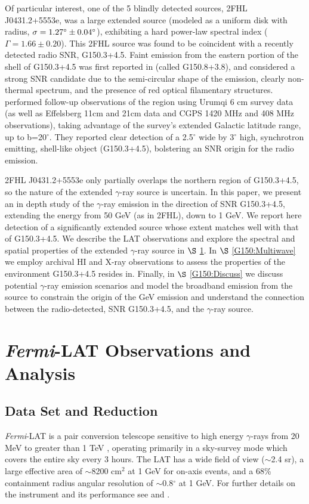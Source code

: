 \documentclass[iop]{emulateapj}
\newcommand{\gam}{$\gamma$-ray}
\newcommand{\FermiLat}{\emph{Fermi}-LAT }     %
\newcommand{\Gone}{G150.3+4.5}
\begin{document}
Of particular interest, one of the 5 blindly detected sources, 2FHL J0431.2+5553e, was a large extended source  (modeled as a uniform disk with radius, ${\rm \sigma = 1.27^\circ \pm 0.04^\circ}$), exhibiting a hard power-law spectral index ($\Gamma = 1.66 \pm 0.20$). This 2FHL source was found to be coincident with a recently detected radio SNR, \Gone{}. Faint emission from the eastern portion of the shell of \Gone{} was first reported in \cite{Gerbrandt14} (called G150.8+3.8), and considered a strong SNR candidate due to the semi-circular shape of the emission, clearly non-thermal spectrum, and the presence of red optical filamentary structures. \cite{Gao14} performed follow-up observations of the region using Urumqi 6 cm survey data (as well as Effelsberg 11cm and 21cm data and CGPS 1420 MHz and 408 MHz observations), taking advantage of the survey's extended Galactic latitude range, up to b=20$^\circ$. They reported clear detection of a 2.5$^\circ$ wide by 3$^\circ$ high, synchrotron emitting, shell-like object (\Gone{}),  bolstering an SNR origin for the radio emission.

2FHL J0431.2+5553e only partially overlaps the northern region of \Gone{}, so the nature of the extended \gam{} source is uncertain. In this paper, we present an in depth study of the \gam{} emission in the direction of SNR \Gone{}, extending the energy from 50 GeV (as in 2FHL), down to 1 GeV.  We report here  detection of  a significantly extended source whose extent matches well with that of \Gone{}. We describe the LAT observations and explore the spectral and spatial properties of the extended \gam{} source in $\S$ \ref{G150:LATobs}. In $\S$ \ref{G150:Multiwave} we employ archival HI and X-ray observations to assess the properties of the environment \Gone{} resides in. Finally, in $\S$ \ref{G150:Discuss} we discuss potential \gam{} emission scenarios and model the broadband emission from the source to constrain the origin of the GeV emission and understand the connection between the radio-detected, SNR \Gone{}, and the \gam{} source.

%
%

\newpage
\section{\FermiLat{} Observations and  Analysis }\label{G150:LATobs}
\subsection{Data Set and Reduction}\label{G150:LATdata}
\FermiLat{} is a pair conversion telescope sensitive to high energy \gam{}s  from 20 MeV to greater than 1 TeV \citep{2FHL}, operating primarily in a sky-survey mode which covers  the entire sky every 3 hours. The LAT has a wide field of view ($\sim$2.4 sr), a large effective area of $\sim$8200 cm$^2$ at  1 GeV for on-axis events, and a  68\% containment radius angular resolution  of $\sim$0.8$^\circ$  at 1 GeV. For further details  on the instrument and its performance see \cite{atwood09} and \cite{lat_perf}.%
\end{document}
